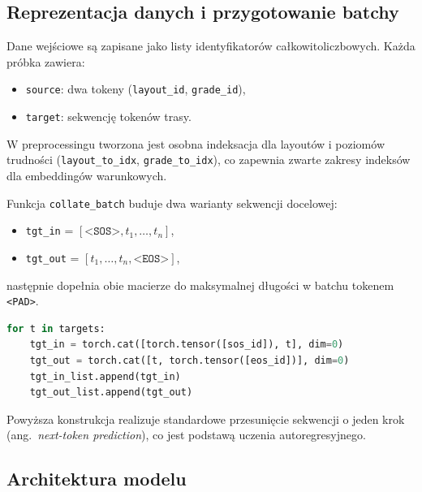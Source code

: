 \documentclass[12pt,a4paper]{article}
\begin{document}
\subsection{Reprezentacja danych i przygotowanie batchy}

Dane wejściowe są zapisane jako listy identyfikatorów całkowitoliczbowych. Każda próbka zawiera:
\begin{itemize}[leftmargin=1.5em]
    \item \texttt{source}: dwa tokeny (\texttt{layout\_id}, \texttt{grade\_id}),
    \item \texttt{target}: sekwencję tokenów trasy.
\end{itemize}

W preprocessingu tworzona jest osobna indeksacja dla layoutów i poziomów trudności (\texttt{layout\_to\_idx}, \texttt{grade\_to\_idx}), co zapewnia zwarte zakresy indeksów dla embeddingów warunkowych.

Funkcja \texttt{collate\_batch} buduje dwa warianty sekwencji docelowej:
\begin{itemize}[leftmargin=1.5em]
    \item \texttt{tgt\_in} = $[\texttt{<SOS>}, t_1, \dots, t_n]$,
    \item \texttt{tgt\_out} = $[t_1, \dots, t_n, \texttt{<EOS>}]$,
\end{itemize}
następnie dopełnia obie macierze do maksymalnej długości w batchu tokenem \texttt{<PAD>}.

\begin{lstlisting}[language=Python,caption={Budowa par \texttt{tgt\_in}/\texttt{tgt\_out} (\texttt{collate\_batch}).}]
for t in targets:
    tgt_in = torch.cat([torch.tensor([sos_id]), t], dim=0)
    tgt_out = torch.cat([t, torch.tensor([eos_id])], dim=0)
    tgt_in_list.append(tgt_in)
    tgt_out_list.append(tgt_out)
\end{lstlisting}

Powyższa konstrukcja realizuje standardowe przesunięcie sekwencji o jeden krok (ang.\ \textit{next-token prediction}), co jest podstawą uczenia autoregresyjnego.

\subsection{Architektura modelu}
\label{sec:architecture}
\end{document}
